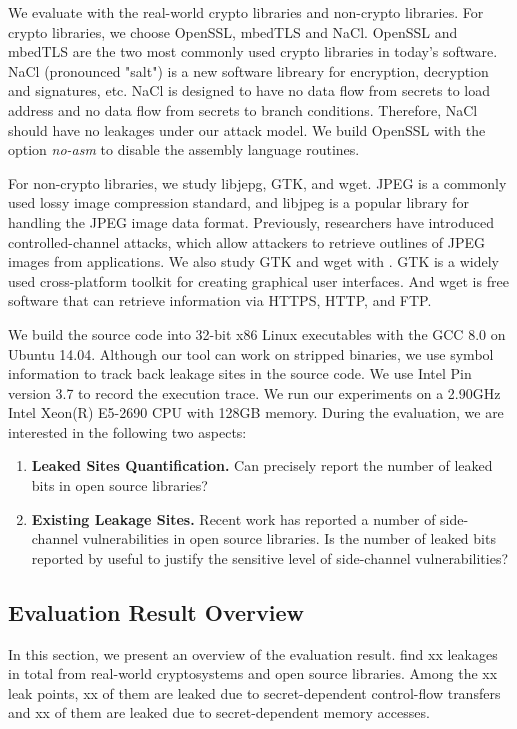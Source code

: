 We evaluate \tool{} with the real-world crypto libraries and non-crypto libraries. 
For crypto libraries, we choose OpenSSL, mbedTLS and NaCl. 
OpenSSL and mbedTLS are the two most commonly used
crypto libraries in today's software. NaCl (pronounced "salt") is a 
new software libreary for encryption, decryption and signatures, etc.
NaCl is designed to have no data flow from secrets to load address and no data 
flow from secrets to branch conditions. Therefore, NaCl should have no leakages
under our attack model. We build OpenSSL with the option \textit{no-asm} 
to disable the assembly language routines. 

For non-crypto libraries, we study libjepg, GTK, and wget.
JPEG is a commonly used lossy image compression standard, and
libjpeg is a popular library for handling the JPEG image data
format. Previously, researchers have introduced controlled-channel
attacks, which allow attackers to retrieve outlines of JPEG images
from applications. We also study GTK and wget with \tool{}. GTK 
is a widely used cross-platform toolkit for creating graphical user
interfaces. And wget is free software that can retrieve information
via HTTPS, HTTP, and FTP.

We build the source code into 32-bit x86 Linux executables with the 
GCC 8.0 on Ubuntu 14.04. Although our tool can
work on stripped binaries, we use symbol information to track
back leakage sites in the source code. We use Intel Pin version 3.7 
to record the execution trace. We run our experiments on a 2.90GHz
Intel Xeon(R) E5-2690 CPU with 128GB memory.
During the evaluation, we are interested in the following two
aspects:
\begin{enumerate}
    
    \item \textbf{Leaked Sites Quantification.} Can \tool{} precisely
    report the number of leaked bits in open source libraries?
    \item \textbf{Existing Leakage Sites.} Recent work has reported a number
    of side-channel vulnerabilities in open source libraries. 
    Is the number of leaked bits reported by \tool{} useful to justify 
    the sensitive level of side-channel vulnerabilities?
   
\end{enumerate}

\subsection{Evaluation Result Overview}
In this section, we present an overview of the evaluation result. 
\tool find xx leakages in total from real-world cryptosystems and open
source libraries. Among the xx leak points, xx of them are leaked due
to secret-dependent control-flow transfers and xx of them are leaked 
due to secret-dependent memory accesses. 

